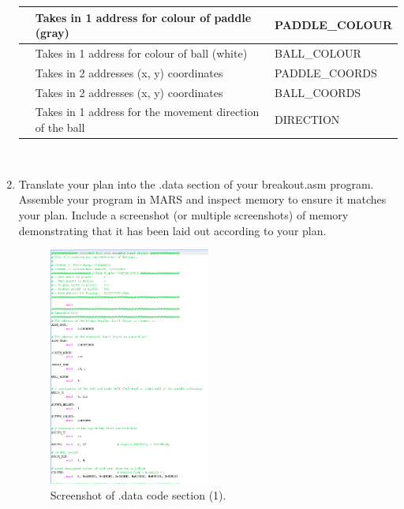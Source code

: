 \documentclass{article}
\begin{document}
\begin{enumerate}
\begin{table}[]
\begin{tabular}{|l|l|l|}
                                  & Takes in 1 address for colour of paddle (gray)                                 & PADDLE\_COLOUR \\ \hline
                 & Takes in 1 address for colour of ball (white)                                  & BALL\_COLOUR   \\ \hline
                 & Takes in 2 addresses (x, y) coordinates                           & PADDLE\_COORDS \\ \hline
                 & Takes in 2 addresses (x, y) coordinates                           & BALL\_COORDS   \\ \hline
                 & Takes in 1 address for the movement direction of the ball         & DIRECTION      \\ \hline
\end{tabular}
\end{table}

\\

\newpage
\item Translate your plan into the .data section of your breakout.asm program. Assemble your program in MARS and inspect memory to ensure it matches your plan. Include a screenshot (or multiple screenshots) of memory demonstrating that it has been laid out according to your plan.

\begin{figure}[ht!]
    \centering
    \includegraphics[width=0.5\textwidth]{memory2.png}
    \caption{Screenshot of .data code section (1).}
    \label{f:part1_memory1}
\end{figure}


\end{enumerate}
\end{document}
